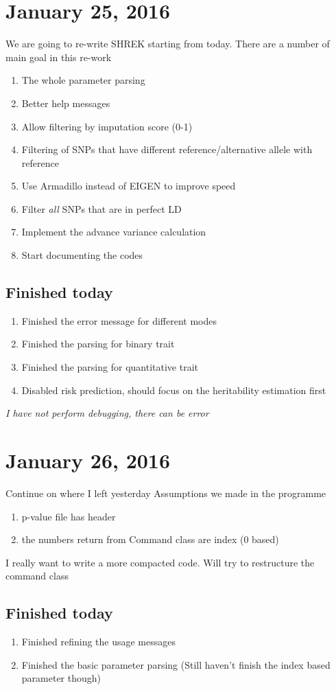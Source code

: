 \documentclass[12pt]{article}
\begin{document}
	\section{January 25, 2016}
	We are going to re-write SHREK starting from today. 
	There are a number of main goal in this re-work
	\begin{enumerate}
		\item The whole parameter parsing 
		\item Better help messages
		\item Allow filtering by imputation score (0-1)
		\item Filtering of SNPs that have different reference/alternative allele with reference
		\item Use Armadillo instead of EIGEN to improve speed
		\item Filter \emph{all} SNPs that are in perfect LD
		\item Implement the advance variance calculation 
		\item Start documenting the codes
	\end{enumerate}
	\subsection{Finished today}
	\begin{enumerate}
		\item Finished the error message for different modes
		\item Finished the parsing for binary trait
		\item Finished the parsing for quantitative trait
		\item Disabled risk prediction, should focus on the heritability estimation first
	\end{enumerate}
	\emph{I have not perform debugging, there can be error}
	\section{January 26, 2016}
	Continue on where I left yesterday
	Assumptions we made in the programme
	\begin{enumerate}
		\item p-value file has header
		\item the numbers return from Command class are index (0 based)
	\end{enumerate}
	I really want to write a more compacted code.
	Will try to restructure the command class
	\subsection{Finished today}
	\begin{enumerate}
		\item Finished refining the usage messages
		\item Finished the basic parameter parsing (Still haven't finish the index based parameter though)
	\end{enumerate}
\end{document}

